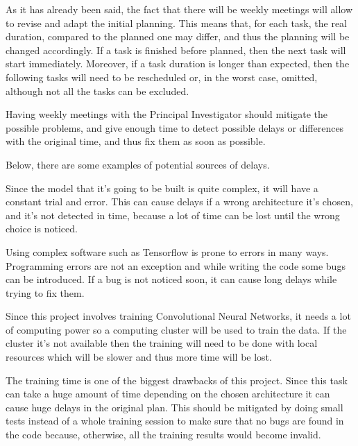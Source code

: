 
As it has already been said, the fact that there will be weekly meetings will allow to 
revise and adapt the initial planning. This means that, for each task, the real duration, 
compared to the planned one may differ, and thus the planning will be changed accordingly. 
If a task is finished before planned, then the next task will start immediately. 
Moreover, if a task duration is longer than expected, then the following tasks will need 
to be rescheduled or, in the worst case, omitted, although not all the tasks can be excluded.

Having weekly meetings with the Principal Investigator should mitigate the possible problems,
and give enough time to detect possible delays or differences with the original time, and
thus fix them as soon as possible.

Below, there are some examples of potential sources of delays.


Since the model that it's going to be built is quite complex, it will have a constant trial
and error. This can cause delays if a wrong architecture it's chosen, and it's not detected
in time, because a lot of time can be lost until the wrong choice is noticed. 


Using complex software such as Tensorflow is prone to errors in many ways. Programming errors
are not an exception and while writing the code some bugs can be introduced. If a bug is not 
noticed soon, it can cause long delays while trying to fix them.


Since this project involves training Convolutional Neural Networks, it needs a lot of computing 
power so a computing cluster will be used to train the data. If the cluster it's not available
then the training will need to be done with local resources which will be slower and thus 
more time will be lost.


The training time is one of the biggest drawbacks of this project. Since this task
can take a huge amount of time depending on the chosen architecture it can cause
huge delays in the original plan. This should be mitigated by doing small tests
instead of a whole training session to make sure that no bugs are found in the code 
because, otherwise, all the training results would become invalid.

